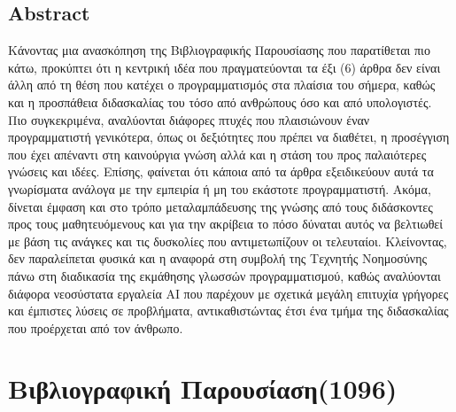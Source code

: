 \documentclass{report}
\begin{document}
\section{Abstract}
Κάνοντας μια ανασκόπηση της Βιβλιογραφικής Παρουσίασης που παρατίθεται πιο κάτω, προκύπτει ότι η κεντρική ιδέα που πραγματεύονται τα έξι (6) άρθρα δεν είναι άλλη από τη θέση που κατέχει ο προγραμματισμός στα πλαίσια του σήμερα, καθώς και η προσπάθεια διδασκαλίας του τόσο από ανθρώπους όσο και από υπολογιστές. Πιο συγκεκριμένα, αναλύονται διάφορες πτυχές που πλαισιώνουν έναν προγραμματιστή γενικότερα, όπως οι δεξιότητες που πρέπει να διαθέτει, η προσέγγιση που έχει απέναντι στη καινούργια γνώση αλλά και η στάση του προς παλαιότερες γνώσεις και ιδέες. Επίσης, φαίνεται ότι κάποια από τα άρθρα εξειδικεύουν αυτά τα γνωρίσματα ανάλογα με την εμπειρία ή μη του εκάστοτε προγραμματιστή. Ακόμα, δίνεται έμφαση και στο τρόπο μεταλαμπάδευσης της γνώσης από τους διδάσκοντες προς τους μαθητευόμενους και για την ακρίβεια το πόσο δύναται αυτός να βελτιωθεί με βάση τις ανάγκες και τις δυσκολίες που αντιμετωπίζουν οι τελευταίοι. Κλείνοντας, δεν παραλείπεται φυσικά και η αναφορά στη συμβολή της Τεχνητής Νοημοσύνης πάνω στη διαδικασία της εκμάθησης γλωσσών προγραμματισμού, καθώς αναλύονται διάφορα νεοσύστατα εργαλεία AI που παρέχουν με σχετικά μεγάλη επιτυχία γρήγορες και έμπιστες λύσεις σε προβλήματα, αντικαθιστώντας έτσι ένα τμήμα της διδασκαλίας που προέρχεται από τον άνθρωπο.  

\chapter{Βιβλιογραφική Παρουσίαση(1096)}
\end{document}
